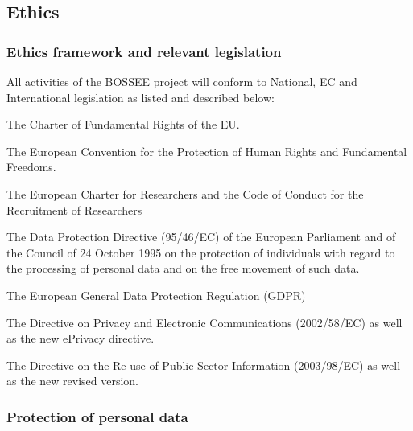 \subsection{Ethics}

\subsubsection{Ethics framework and relevant legislation}

All activities of the BOSSEE project will conform to National, EC and International legislation as listed and described below:
\begin{compactitem}
\item The Charter of Fundamental Rights of the EU.
\item The European Convention for the Protection of Human Rights and Fundamental Freedoms.
\item The European Charter for Researchers and the Code of Conduct for the Recruitment of Researchers
\item The Data Protection Directive (95/46/EC) of the European Parliament and of the Council of 24 October 1995 on the protection of individuals with regard to the processing of personal data and on the free movement of such data.
\item The European General Data Protection Regulation (GDPR)
\item The Directive on Privacy and Electronic Communications (2002/58/EC) as well as the new ePrivacy directive.
\item The Directive on the Re-use of Public Sector Information (2003/98/EC) as well as the new revised version.
\end{compactitem}

\subsubsection{Protection of personal data}

